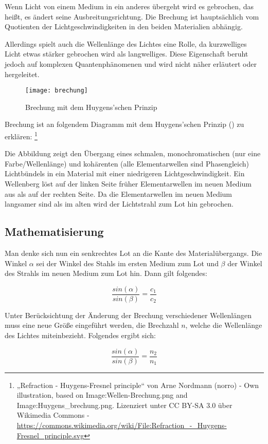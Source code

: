 Wenn Licht von einem Medium in ein anderes übergeht wird es gebrochen, das heißt, es ändert seine Ausbreitungsrichtung. Die Brechung ist hauptsächlich vom Quotienten der Lichtgeschwindigkeiten in den beiden Materialien abhängig.

Allerdings spielt auch die Wellenlänge des Lichtes eine Rolle, da kurzwelliges Licht etwas stärker gebrochen wird als langwelliges. Diese Eigenschaft beruht jedoch auf komplexen Quantenphänomenen und wird nicht näher erläutert oder hergeleitet.

\begin{wrapfigure}{o}{0.5\textwidth}
	\center
	\texttt{[image: brechung]}
	\caption{Brechung mit dem Huygens'schen Prinzip}
	\label{fig:brechung}
\end{wrapfigure}

Brechung ist an folgendem Diagramm mit dem Huygens'schen Prinzip () zu erklären: \footnote{„Refraction - Huygens-Fresnel principle“ von Arne Nordmann (norro) - Own illustration, based on Image:Wellen-Brechung.png and Image:Huygens\_brechung.png. Lizenziert unter CC BY-SA 3.0 über Wikimedia Commons - \url{https://commons.wikimedia.org/wiki/File:Refraction\_-\_Huygens-Fresnel\_principle.svg}}

Die Abbildung zeigt den Übergang eines schmalen, monochromatischen (nur eine Farbe/Wellenlänge) und kohärenten (alle Elementarwellen sind Phasengleich) Lichtbündels in ein Material mit einer niedrigeren Lichtgeschwindigkeit. Ein Wellenberg löst auf der linken Seite früher Elementarwellen im neuen Medium aus als auf der rechten Seite. Da die Elementarwellen im neuen Medium langsamer sind als im alten wird der Lichtstrahl zum Lot hin gebrochen.

\subsection{Mathematisierung}

Man denke sich nun ein senkrechtes Lot an die Kante des Materialübergangs. Die Winkel $\alpha$ sei der Winkel des Stahls im ersten Medium zum Lot und $\beta$ der Winkel des Strahls im neuen Medium zum Lot hin. Dann gilt folgendes:
	
	\begin{equation}
		\frac{sin{(\alpha)}}{sin{(\beta)}} = \frac{c_1}{c_2}
	\end{equation}
	
Unter Berücksichtung der Änderung der Brechung verschiedener Wellenlängen muss eine neue Größe eingeführt werden, die Brechzahl $n$, welche die Wellenlänge des Lichtes miteinbezieht. Folgendes ergibt sich:
	
	\begin{equation} \label{eq:brechungsgesetz}
		\frac{sin{(\alpha)}}{sin{(\beta)}} = \frac{n_2}{n_1}
	\end{equation}